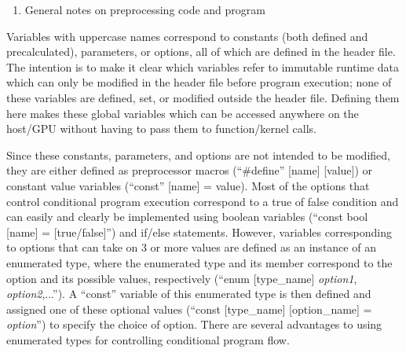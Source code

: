 \documentclass{article}
\begin{document}
\begin{enumerate}[label = (\arabic*), leftmargin = 0.0cm, resume = section]
\bfseries
\item General notes on preprocessing code and program
\end{enumerate}
Variables with uppercase names correspond to constants (both defined and precalculated), parameters, or options, all of which are defined in the header file.  The intention is to make it clear which variables refer to immutable runtime data which can only be modified in the header file before program execution; none of these variables are defined, set, or modified outside the header file.  Defining them here makes these global variables which can be accessed anywhere on the host/GPU without having to pass them to function/kernel calls.


Since these constants, parameters, and options are not intended to be modified, they are either defined as preprocessor macros (``\#define'' [name] [value]) or constant value variables (``const'' [name] = value).  Most of the options that control conditional program execution correspond to a true of false condition and can easily and clearly be implemented using boolean variables (``const bool [name] = [true/false]'') and if/else statements.  However, variables corresponding to options that can take on 3 or more values are defined as an instance of an enumerated type, where the enumerated type and its member correspond to the option and its possible values, respectively (``enum [type\_name] {\emph{option1}, \emph{option2},...}'').  A ``const'' variable of this enumerated type is then defined and assigned one of these optional values (``const [type\_name] [option\_name] = \emph{option}'') to specify the choice of option.  There are several advantages to using enumerated types for controlling conditional program flow.
\end{document}
